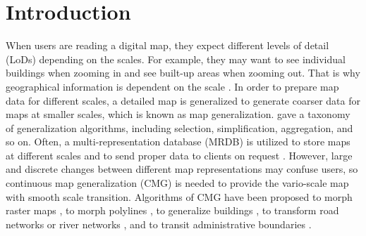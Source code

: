 \documentclass{ica}
\begin{document}


\maketitle

\thispagestyle{first}


\section{Introduction}

When users are reading a digital map,
they expect different levels of detail (LoDs) depending on the scales.
For example, they may want to see individual buildings when zooming in
and see built-up areas when zooming out.
That is why geographical information is dependent on the scale
\citep{Muller1995Generalization,Weibel1997}. 
In order to prepare map data for different scales,
a detailed map is generalized to generate coarser data 
for maps at smaller scales,
which is known as map generalization.
\citet{Mackaness2017Generalization} gave a taxonomy of 
generalization algorithms, 
including selection, simplification, aggregation, and so on.
Often, a multi-representation database (MRDB) is utilized to store
maps at different scales and to send proper data to clients on request
\citep[\eg][]{Hampe2004multiple}.
However, large and discrete changes between different map representations
may confuse users,
so continuous map generalization (CMG) is needed to
provide the vario-scale map with smooth scale transition.
Algorithms of CMG have been proposed 
to morph raster maps
\citep[\eg][]{Pantazis2009a}, 
to morph polylines
\citep[\eg][]{Noellenburg2008,Deng2015,Li2017Annealing},
to generalize buildings
\citep[\eg][]{Li2017_Building,Touya2017Progressive},
to transform road networks or river networks
\citep[\eg][]{Suba2016Road,Chimani2014Eat,Huang2017Matrix},
and to transit administrative boundaries
\citep[\eg][]{Peng2016Admin}.

\end{document}
